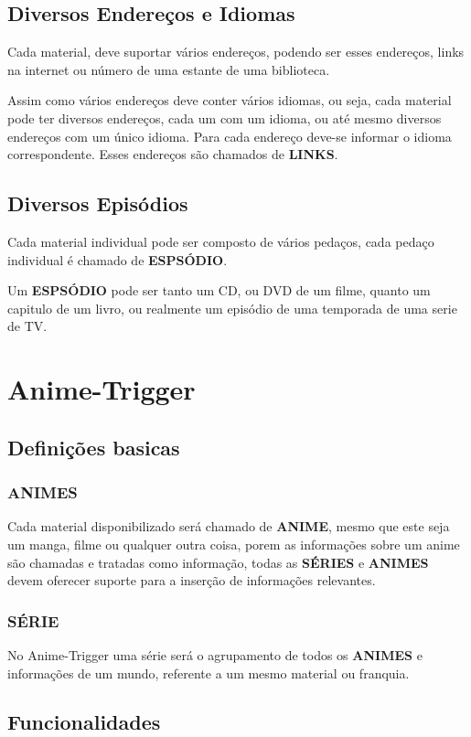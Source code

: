 \documentclass{abnt}
\begin{document}
\section{Diversos Endereços e Idiomas}
Cada material, deve suportar vários endereços, podendo ser esses endereços, links na internet ou número de uma estante de uma biblioteca.
\par
Assim como vários endereços deve conter vários idiomas, ou seja, cada material pode ter diversos endereços, cada um com um idioma, ou até mesmo diversos endereços com um único idioma. Para cada endereço deve-se informar o idioma correspondente.
Esses endereços são chamados de  \textbf{LINKS}.
 \section{Diversos Episódios}
\par
Cada material individual pode ser composto de vários pedaços, cada pedaço individual é chamado de \textbf{ESPSÓDIO}.
\par
Um \textbf{ESPSÓDIO} pode ser tanto um CD, ou DVD de um filme, quanto um capitulo de um livro, ou realmente um episódio de uma temporada de uma serie de TV.

\chapter{Anime-Trigger}
\section{Definições basicas}
\subsection{ANIMES}
Cada material disponibilizado será chamado de \textbf{ANIME}, mesmo que este seja um manga, filme ou qualquer outra coisa, porem as informações sobre um anime são chamadas e tratadas como informação, todas as \textbf{SÉRIES} e \textbf{ANIMES} devem oferecer suporte para a inserção de informações relevantes.
\subsection{SÉRIE}
No Anime-Trigger uma série será o agrupamento de todos os \textbf{ANIMES} e informações de um mundo, referente a um mesmo material ou franquia.
\section{Funcionalidades}
\end{document}
